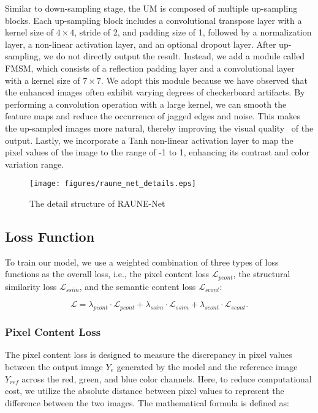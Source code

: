 \documentclass[runningheads]{llncs}
\begin{document}
Similar to down-sampling stage, the UM is composed of multiple up-sampling blocks. Each up-sampling block includes a convolutional transpose layer with a kernel size of $4\times4$, stride of 2, and padding size of 1, followed by a normalization layer, a non-linear activation layer, and an optional dropout layer. After up-sampling, we do not directly output the result. Instead, we add a module called FMSM, which consists of a reflection padding layer and a convolutional layer with a kernel size of $7\times7$. We adopt this module because we have observed that the enhanced images often exhibit varying degrees of checkerboard artifacts. By performing a convolution operation with a large kernel, we can smooth the feature maps and reduce the occurrence of jagged edges and noise. This makes the up-sampled images more natural, thereby improving the visual quality~\cite{liu2015frame,liu2020blind} of the output. Lastly, we incorporate a Tanh non-linear activation layer to map the pixel values of the image to the range of -1 to 1, enhancing its contrast and color variation range.

\begin{figure}
    \centering
    \texttt{[image: figures/raune\_net\_details.eps]}
    \caption{The detail structure of RAUNE-Net}
    \label{raune-net-details}
\end{figure}

\subsection{Loss Function}
To train our model, we use a weighted combination of three types of loss functions as the overall loss, i.e., the pixel content loss $\mathcal{L}_{pcont}$, the structural similarity loss $\mathcal{L}_{ssim}$, and the semantic content loss $\mathcal{L}_{scont}$:

\begin{equation}
    \mathcal{L} = \lambda_{pcont} \cdot \mathcal{L}_{pcont} + \lambda_{ssim} \cdot \mathcal{L}_{ssim} + \lambda_{scont} \cdot \mathcal{L}_{scont}.
\end{equation}

\subsubsection{Pixel Content Loss}
The pixel content loss is designed to measure the discrepancy in pixel values between the output image $Y_{e}$ generated by the model and the reference image $Y_{ref}$ across the red, green, and blue color channels. Here, to reduce computational cost, we utilize the absolute distance between pixel values to represent the difference between the two images. The mathematical formula is defined as:
\end{document}

